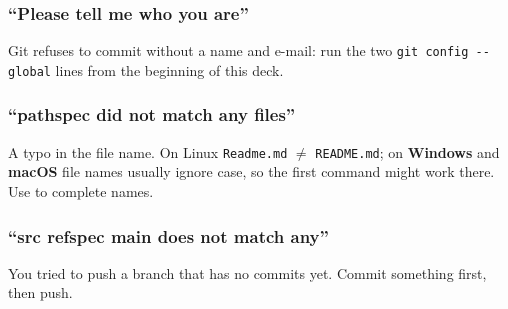 \documentclass[aspectratio=169,10pt,compress]{beamer}
\newcommand{\win}{\textbf{Windows}}
\newcommand{\mac}{\textbf{macOS}}
\begin{document}
\begin{frame}[t,fragile] \frametitle{``Please tell me who you are''}

  \vspace{0.1em}
  \small
  Git refuses to commit without a name and e-mail: run the two \texttt{git config -{}-global} lines from the beginning of this deck.
\end{frame}




\begin{frame}[t,fragile] \frametitle{``pathspec did not match any files''}

  \vspace{0.1em}
  \small
  A typo in the file name. On Linux \texttt{Readme.md} $\neq$ \texttt{README.md}; on \win{} and \mac{} file names usually ignore case, so the first command might work there. Use  to complete names.
\end{frame}




\begin{frame}[t,fragile] \frametitle{``src refspec main does not match any''}

  \vspace{0.1em}
  \small
  You tried to push a branch that has no commits yet. Commit something first, then push.
\end{frame}

\end{document}
